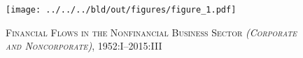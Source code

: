 \begin{figure}[t]
    \centering
    \texttt{[image: ../../../bld/out/figures/figure\_1.pdf]}
    \caption{\textsc{Financial Flows in the Nonfinancial Business Sector \textit{(Corporate and Noncorporate)}}, 1952:I--2015:III}
    \label{fig:figure_1}
\end{figure}
